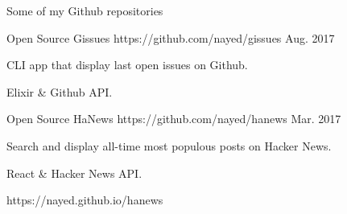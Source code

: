 {Some of my Github repositories}

\begin{cventries}

  \cventry
  {Open Source} %
  {Gissues} %
  {https://github.com/nayed/gissues} %
  {Aug. 2017} %
    {
      \begin{cvitems} %
      \item {CLI app that display last open issues on Github.}
      \item {Elixir \& Github API.}
      \end{cvitems}
    }
  \cventry
  {Open Source} %
  {HaNews} %
  {https://github.com/nayed/hanews} %
  {Mar. 2017} %
    {
      \begin{cvitems} %
      \item {Search and display all-time most populous posts on Hacker News.}
      \item {React \& Hacker News API.}
      \item {https://nayed.github.io/hanews}
      \end{cvitems}
    }
\end{cventries}
